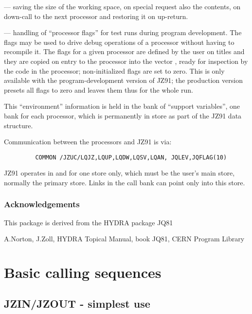 --- saving the size of the working space,
on special request also the contents,
on down-call to the next processor
and restoring it on up-return.

--- handling of ``processor flags'' for test runs during
program development.
The flags may be used to drive debug operations of
a processor without having to recompile it.
The flags for a given processor are defined by the user
on titles  and they
are copied on entry to the processor into the vector ,
ready for inspection by the code in the processor;
non-initialized flags are set to zero.
This is only available with the program-development
version of JZ91;
the production version presets all flags to zero
and leaves them thus for the whole run.

This ``environment'' information is held in
the bank of ``support variables'',
one bank for each processor,
which is permanently in store as part of the JZ91 data structure.

Communication between the processors and JZ91 is via:
\begin{verbatim}
         COMMON /JZUC/LQJZ,LQUP,LQDW,LQSV,LQAN, JQLEV,JQFLAG(10)
\end{verbatim}
JZ91 operates in and for one store only,
which must be the user's main store,
normally the primary store.
Links in the call bank can point only into this store.


\subsection*{Acknowledgements} 

This package is derived from the HYDRA package JQ81

A.Norton, J.Zoll, HYDRA Topical Manual, book JQ81, CERN Program Library

\chapter{Basic calling sequences}

\section{JZIN/JZOUT - simplest use}

